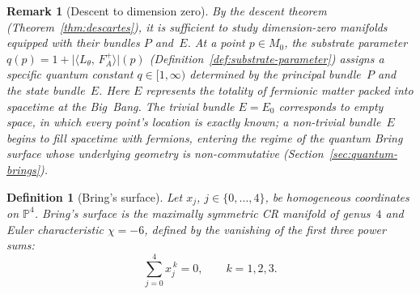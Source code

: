 \documentclass[12pt,a4paper]{report}
\newtheorem{definition}[theorem]{Definition}
\newtheorem{remark}[theorem]{Remark}
\providecommand{\DIFaddend}{} %
\DeclareRobustCommand{\DIFaddend}{\DIFOaddend \let\includegraphics\DIFOincludegraphics} %
\begin{document}
\DIFaddend \begin{remark}[Descent to dimension zero]
\label{rem:descent-to-zero}
By the descent theorem (Theorem~\ref{thm:descartes}), it is sufficient
to study dimension-zero manifolds equipped with their bundles $P$ and~$E$.
At a point $p\in M_0$, the substrate parameter
$q(p)= 1 + \lvert\langle L_\theta,\, F_A^{+}\rangle\rvert(p)$
(Definition~\ref{def:substrate-parameter}) assigns a specific quantum
constant $q\in[1,\infty)$ determined by the principal bundle~$P$ and the
state bundle~$E$.  Here $E$ represents the totality of fermionic matter
packed into spacetime at the Big~Bang.  The trivial bundle $E=E_0$
corresponds to empty space, in which every point's location is exactly
known; a non-trivial bundle~$E$ begins to fill spacetime with fermions,
entering the regime of the quantum Bring surface whose underlying geometry
is non-commutative (Section~\ref{sec:quantum-brings}).
\end{remark}

\begin{definition}[Bring's surface]
\label{def:brings-surface}
Let $x_j$, $j\in\{0,\dots,4\}$, be homogeneous coordinates on
$\mathbb{P}^4$.  \emph{Bring's surface} is the maximally symmetric CR
manifold of genus~$4$ and Euler characteristic $\chi=-6$, defined by the
vanishing of the first three power sums:
\[
  \sum_{j=0}^{4}x_j^{\,k}=0,
  \qquad k=1,2,3.
\]
\end{definition}
\end{document}
